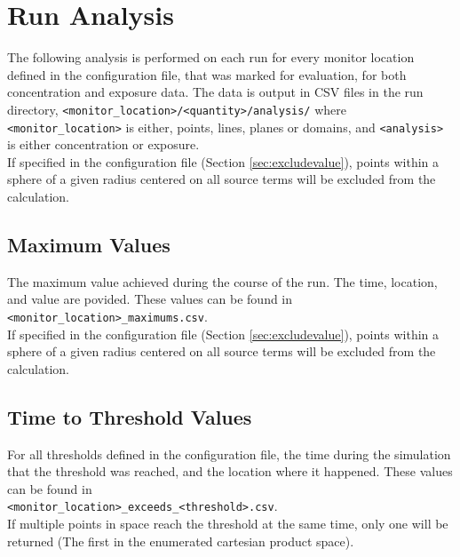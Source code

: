 \documentclass[]{article}
\def\code#1{\texttt{#1}}
\begin{document}
\section{Run Analysis}\label{sec:analysis}
The following analysis is performed on each run for every monitor location
defined in the configuration file, that was marked for evaluation, for both
concentration and exposure data. The data is output in CSV files in the run
directory, \code{<monitor\_location>/<quantity>/analysis/} where
\code{<monitor\_location>} is either, points, lines, planes or domains, and
\code{<analysis>} is either concentration or exposure.\\

\noindent If specified in the configuration file (Section \ref{sec:excludevalue}), points
within a sphere of a given radius centered on all source terms will be excluded from the calculation.\\

\subsection{Maximum Values}
The maximum value achieved during the course of the run. The time, location, and
value are povided. These values can be found in\\

\code{<monitor\_location>\_maximums.csv}. \\

\noindent If specified in the configuration file (Section \ref{sec:excludevalue}), points
within a sphere of a given radius centered on all source terms will be excluded from the calculation.\\

\subsection{Time to Threshold Values}
For all thresholds defined in the configuration file, the time during the
simulation that the threshold was reached, and the location where it happened.
These values can be found in \\

\code{<monitor\_location>\_exceeds\_<threshold>.csv}.\\

\noindent If multiple points in space reach the threshold at the same time, only one will
be returned (The first in the enumerated cartesian product space).\\
\end{document}
